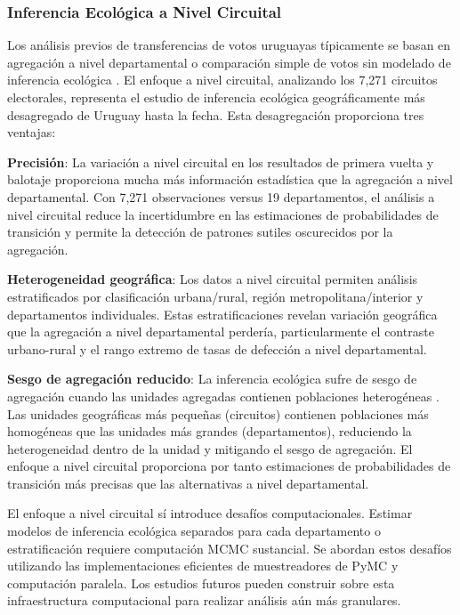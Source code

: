 \subsubsection{Inferencia Ecológica a Nivel Circuital}

Los análisis previos de transferencias de votos uruguayas típicamente se basan en agregación a nivel departamental o comparación simple de votos sin modelado de inferencia ecológica \citep{bottinelli2021elecciones}. El enfoque a nivel circuital, analizando los 7,271 circuitos electorales, representa el estudio de inferencia ecológica geográficamente más desagregado de Uruguay hasta la fecha. Esta desagregación proporciona tres ventajas:

\textbf{Precisión}: La variación a nivel circuital en los resultados de primera vuelta y balotaje proporciona mucha más información estadística que la agregación a nivel departamental. Con 7,271 observaciones versus 19 departamentos, el análisis a nivel circuital reduce la incertidumbre en las estimaciones de probabilidades de transición y permite la detección de patrones sutiles oscurecidos por la agregación.

\textbf{Heterogeneidad geográfica}: Los datos a nivel circuital permiten análisis estratificados por clasificación urbana/rural, región metropolitana/interior y departamentos individuales. Estas estratificaciones revelan variación geográfica que la agregación a nivel departamental perdería, particularmente el contraste urbano-rural y el rango extremo de tasas de defección a nivel departamental.

\textbf{Sesgo de agregación reducido}: La inferencia ecológica sufre de sesgo de agregación cuando las unidades agregadas contienen poblaciones heterogéneas \citep{king1997}. Las unidades geográficas más pequeñas (circuitos) contienen poblaciones más homogéneas que las unidades más grandes (departamentos), reduciendo la heterogeneidad dentro de la unidad y mitigando el sesgo de agregación. El enfoque a nivel circuital proporciona por tanto estimaciones de probabilidades de transición más precisas que las alternativas a nivel departamental.

El enfoque a nivel circuital sí introduce desafíos computacionales. Estimar modelos de inferencia ecológica separados para cada departamento o estratificación requiere computación MCMC sustancial. Se abordan estos desafíos utilizando las implementaciones eficientes de muestreadores de PyMC \citep{abril2023pymc} y computación paralela. Los estudios futuros pueden construir sobre esta infraestructura computacional para realizar análisis aún más granulares.

